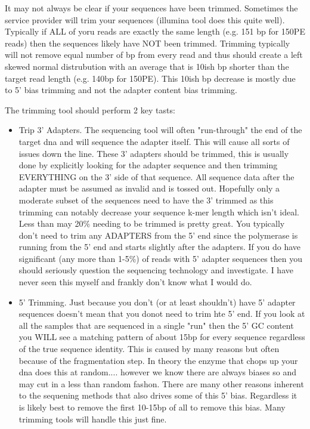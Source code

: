 \documentclass{article}
\begin{document}
    It may not always be clear if your sequences have been trimmed.   Sometimes the service provider will trim your sequences (illumina tool does this quite well).   Typically if ALL of yoru reads are exactly the same length (e.g. 151 bp for 150PE reads) then the sequences likely have NOT been trimmed.   Trimming typically will not remove equal number of bp from every read and thus should create a left skewed normal distrubution with an average that is 10ish bp shorter than the target read length (e.g. 140bp for 150PE).   This 10ish bp decrease is mostly due to 5' bias trimming and not the adapter content bias trimming.

    The trimming tool should perform 2 key tasts:
    \begin{itemize}
        \item Trip 3' Adapters.   The sequencing tool will often "run-through" the end of the target dna and will sequence the adapter itself.   This will cause all sorts of issues down the line.   These 3' adapters should be trimmed, this is usually done by explicitly looking for the adapter sequence and then trimming EVERYTHING on the 3' side of that sequence.   All sequence data after the adapter must be assumed as invalid and is tossed out.    Hopefully only a moderate subset of the sequences need to have the 3' trimmed as this trimming can notably decrease your sequence k-mer length which isn't ideal.   Less than may 20\% needing to be trimmed is pretty great.  You typically don't need to trim any ADAPTERS from the 5' end since the polymerase is running from the 5' end and starts slightly after the adapters.   If you do have significant (any more than 1-5\%) of reads with 5' adapter sequences then you should seriously question the sequencing technology and investigate.   I have never seen this myself and frankly don't know what I would do.
        \item 5' Trimming.  Just because you don't (or at least shouldn't) have 5' adapter sequences doesn't mean that you donot need to trim hte 5' end. If you look at all the samples that are sequenced in a single "run" then the 5' GC content you WILL see a matching pattern of about 15bp for every sequence regardless of the true sequence identity.  This is caused by many reasons but often because of the fragmentation step.  In theory the enzyme that chops up your dna does this at random.... however we know there are always biases so and may cut in a less than random fashon.    There are many other reasons inherent to the sequening methods that also drives some of this 5' bias.   Regardless it is likely best to remove the first 10-15bp of all to remove this bias.  Many trimming tools will handle this just fine.
    \end{itemize}
\end{document}
